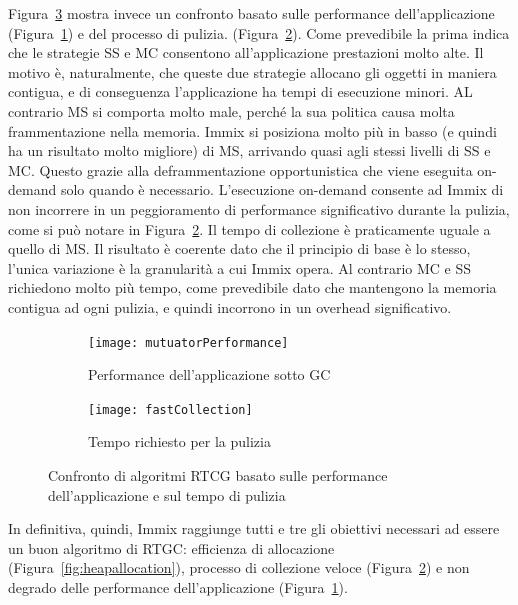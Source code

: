 Figura~\ref{fig:rtgc} mostra invece un confronto basato sulle performance dell'applicazione (Figura~\ref{fig:mutuatorPerformance}) e del processo di pulizia. (Figura~\ref{fig:fastCollection}). Come prevedibile la prima indica che le strategie SS e MC consentono all'applicazione prestazioni molto alte. Il motivo è, naturalmente, che queste due strategie allocano gli oggetti in maniera contigua, e di conseguenza l'applicazione ha tempi di esecuzione minori. AL contrario MS si comporta molto male, perché la sua politica causa molta frammentazione nella memoria. Immix si posiziona molto più in basso (e quindi ha un risultato molto migliore) di MS, arrivando quasi agli stessi livelli di SS e MC. Questo grazie alla deframmentazione opportunistica che viene eseguita on-demand solo quando è necessario. L'esecuzione on-demand consente ad Immix di non incorrere in un peggioramento di performance significativo durante la pulizia, come si può notare in Figura~\ref{fig:fastCollection}. Il tempo di collezione è praticamente uguale a quello di MS. Il risultato è coerente dato che il principio di base è lo stesso, l'unica variazione è la granularità a cui Immix opera. Al contrario MC e SS richiedono molto più tempo, come prevedibile dato che mantengono la memoria contigua ad ogni pulizia, e quindi incorrono in un overhead significativo.
\begin{figure}
	\centering
	\begin{subfigure}[b]{0.5\textwidth}
		\texttt{[image: mutuatorPerformance]}
		\caption{Performance dell'applicazione sotto GC}
		\label{fig:mutuatorPerformance}
	\end{subfigure}
	\hfill
	\begin{subfigure}[b]{0.5\textwidth}
		\texttt{[image: fastCollection]}
		\caption{Tempo richiesto per la pulizia}
		\label{fig:fastCollection}
	\end{subfigure}
	\caption[Confronto di algoritmi RTCG]{Confronto di algoritmi RTCG basato sulle performance dell'applicazione e sul tempo di pulizia}\label{fig:rtgc}
\end{figure}

In definitiva, quindi, Immix raggiunge tutti e tre gli obiettivi necessari ad essere un buon algoritmo di RTGC: efficienza di allocazione (Figura~\ref{fig:heapallocation}), processo di collezione veloce (Figura~\ref{fig:fastCollection}) e non degrado delle performance dell'applicazione (Figura~\ref{fig:mutuatorPerformance}).